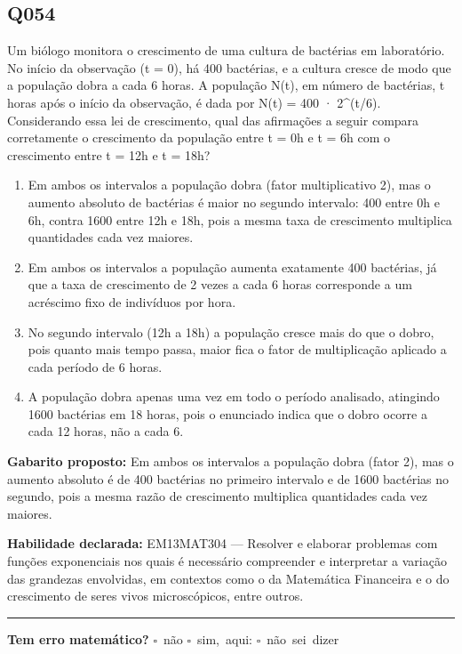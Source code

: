 \documentclass[11pt,a4paper]{article}
\begin{document}
\begin{samepage}
\subsection*{Q054}
Um biólogo monitora o crescimento de uma cultura de bactérias em laboratório. No início da observação (t = 0), há 400 bactérias, e a cultura cresce de modo que a população dobra a cada 6 horas. A população N(t), em número de bactérias, t horas após o início da observação, é dada por N(t) = 400 · 2\textasciicircum{}(t/6). Considerando essa lei de crescimento, qual das afirmações a seguir compara corretamente o crescimento da população entre t = 0h e t = 6h com o crescimento entre t = 12h e t = 18h?
\begin{enumerate}[label=(\alph*),nosep,leftmargin=*]
\item Em ambos os intervalos a população dobra (fator multiplicativo 2), mas o aumento absoluto de bactérias é maior no segundo intervalo: 400 entre 0h e 6h, contra 1600 entre 12h e 18h, pois a mesma taxa de crescimento multiplica quantidades cada vez maiores.
\item Em ambos os intervalos a população aumenta exatamente 400 bactérias, já que a taxa de crescimento de 2 vezes a cada 6 horas corresponde a um acréscimo fixo de indivíduos por hora.
\item No segundo intervalo (12h a 18h) a população cresce mais do que o dobro, pois quanto mais tempo passa, maior fica o fator de multiplicação aplicado a cada período de 6 horas.
\item A população dobra apenas uma vez em todo o período analisado, atingindo 1600 bactérias em 18 horas, pois o enunciado indica que o dobro ocorre a cada 12 horas, não a cada 6.
\end{enumerate}

\textbf{Gabarito proposto:} Em ambos os intervalos a população dobra (fator 2), mas o aumento absoluto é de 400 bactérias no primeiro intervalo e de 1600 bactérias no segundo, pois a mesma razão de crescimento multiplica quantidades cada vez maiores.

\textbf{Habilidade declarada:} EM13MAT304 --- Resolver e elaborar problemas com funções exponenciais nos quais é necessário compreender e interpretar a variação das grandezas envolvidas, em contextos como o da Matemática Financeira e o do crescimento de seres vivos microscópicos, entre outros.
\end{samepage}

\noindent\rule{\linewidth}{0.4pt}
\textbf{Tem erro matemático?}\quad
\mbox{$\square$~não} \quad \mbox{$\square$~sim, aqui:} \underline{\hspace{5cm}}
\quad \mbox{$\square$~não sei dizer}
\end{document}
